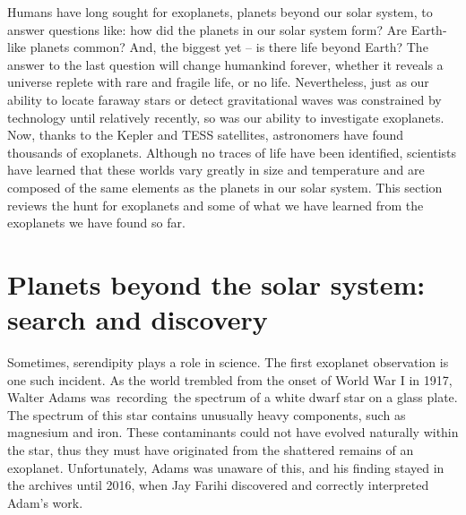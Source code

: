 Humans have long sought for exoplanets, planets beyond our solar system, to answer questions like: how did the planets in our solar system form? Are Earth-like planets common? And, the biggest yet -- is there life beyond Earth? 
The answer to the last question will change humankind forever, whether it reveals a universe replete with rare and fragile life, or no life.
Nevertheless, just as our ability to locate faraway stars or detect gravitational waves was constrained by technology until relatively recently, so was our ability to investigate exoplanets.
Now, thanks to the Kepler and TESS satellites, astronomers have found thousands of exoplanets.
Although no traces of life have been identified, scientists have learned that these worlds vary greatly in size and temperature and are composed of the same elements as the planets in our solar system.
This section reviews the hunt for exoplanets and some of what we have learned from the exoplanets we have found so far.


\section{Planets beyond the solar system: search and discovery}

Sometimes, serendipity plays a role in science.
The first  exoplanet observation is one such incident.
As the world trembled from the onset of World War I in 1917, Walter Adams was recording the spectrum of a white dwarf star on a glass plate.
The spectrum of this star contains unusually heavy components, such as magnesium and iron.
These contaminants could not have evolved naturally within the star, thus they must have originated from the shattered remains of an exoplanet.
Unfortunately, Adams was unaware of this, and his finding stayed in the archives until 2016, when Jay Farihi discovered and correctly interpreted Adam's work.

